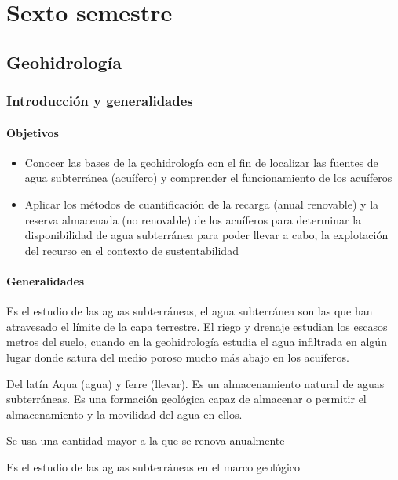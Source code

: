 \part{Sexto semestre}
\chapter{Geohidrología}
\section{Introducción y generalidades}
\subsection{Objetivos}
\begin{itemize}
    \item Conocer las bases de la geohidrología con el fin de localizar las fuentes de agua subterránea (acuífero) y comprender el funcionamiento de los acuíferos
    \item Aplicar los métodos de cuantificación de la recarga (anual renovable) y la reserva almacenada (no renovable) de los acuíferos para determinar la disponibilidad de agua subterránea para poder llevar a cabo, la explotación del recurso en el contexto de sustentabilidad
\end{itemize}
\subsection{Generalidades}
\begin{definition}[Geohidrología]
    Es el estudio de las aguas subterráneas, el agua subterránea son las que han atravesado el límite de la capa terrestre.
    El riego y drenaje estudian los escasos metros del suelo, cuando en la geohidrología estudia el agua infiltrada en algún lugar donde satura del medio poroso mucho más abajo en los acuíferos.
\end{definition}
\begin{definition}[Acuífero]
    Del latín Aqua (agua) y ferre (llevar). Es un almacenamiento natural de aguas subterráneas. Es una formación geológica capaz de almacenar o permitir el almacenamiento y la movilidad del agua en ellos.
\end{definition}
\begin{definition}
    Se usa una cantidad mayor a la que se renova anualmente
\end{definition}
\begin{definition}[Hidrogeología]
    Es el estudio de las aguas subterráneas en el marco geológico
\end{definition}
